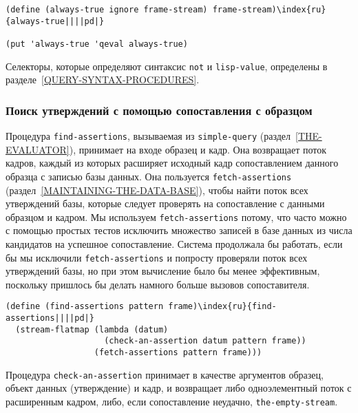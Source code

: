 \begin{Verbatim}[fontsize=\small]
(define (always-true ignore frame-stream) frame-stream)\index{ru}{always-true||||pd|}

(put 'always-true 'qeval always-true)
\end{Verbatim}
Селекторы, которые определяют синтаксис {\tt not} и
{\tt lisp-value}, определены в 
разделе~\ref{QUERY-SYNTAX-PROCEDURES}.

\subsubsection{Поиск утверждений с помощью сопоставления с
образцом}
\label{FINDING-ASSERTIONS-BY-PATTERN-MATCHING}%

Процедура {\tt find-assertions}, вызываемая из
{\tt simple-query} (раз\-дел~\ref{THE-EVALUATOR}),
принимает на входе образец и кадр.  Она возвращает поток кадров,
каждый из которых расширяет исходный кадр сопоставлением данного
образца с записью базы данных.  Она пользуется
{\tt fetch-assertions} (раздел~\ref{MAINTAINING-THE-DATA-BASE}),
чтобы найти поток всех утверждений базы, которые следует проверять на
сопоставление с данными образцом и кадром.  Мы используем
{\tt fetch-assertions} потому, что часто можно с помощью
простых тестов исключить множество записей в базе данных из числа
кандидатов на успешное сопоставление.  Система продолжала бы работать,
если бы мы исключили {\tt fetch-assertions} и попросту
проверяли поток всех утверждений базы, но при этом вычисление было бы
менее эффективным, поскольку пришлось бы делать намного больше вызовов
сопоставителя.
{\sloppy

}
\begin{Verbatim}[fontsize=\small]
(define (find-assertions pattern frame)\index{ru}{find-assertions||||pd|}
  (stream-flatmap (lambda (datum)
                    (check-an-assertion datum pattern frame))
                  (fetch-assertions pattern frame)))
\end{Verbatim}

Процедура {\tt check-an-assertion} принимает в
качестве аргументов образец, объект данных (утверждение) и кадр, и
возвращает либо одноэлементный поток с расширенным кадром, либо, если
сопоставление неудачно, {\tt the-empty-stream}.

